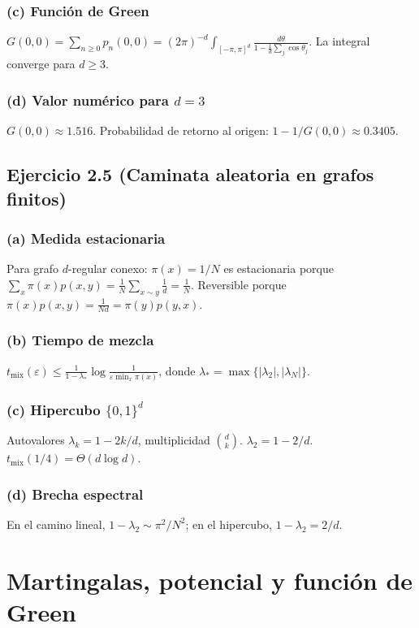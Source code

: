 \documentclass[12pt]{article}
\newcommand{\1}{\mathbf{1}}
\begin{document}
\subsubsection*{(c) Funci\'on de Green}
$G(0,0)=\sum_{n\ge0}p_n(0,0)=(2\pi)^{-d}\int_{[-\pi,\pi]^d}\frac{d\theta}{1-\frac1d\sum_j\cos\theta_j}$. La integral converge para $d\ge3$.

\subsubsection*{(d) Valor num\'erico para $d=3$}
$G(0,0)\approx1.516$. Probabilidad de retorno al origen: $1-1/G(0,0)\approx0.3405$.

\subsection{Ejercicio 2.5 (Caminata aleatoria en grafos finitos)}

\subsubsection*{(a) Medida estacionaria}
Para grafo $d$-regular conexo: $\pi(x)=1/N$ es estacionaria porque $\sum_x \pi(x)p(x,y)=\frac1N\sum_{x\sim y}\frac1d=\frac1N$. Reversible porque $\pi(x)p(x,y)=\frac1{Nd}=\pi(y)p(y,x)$.

\subsubsection*{(b) Tiempo de mezcla}
$t_{\text{mix}}(\varepsilon)\le\frac{1}{1-\lambda_*}\log\frac{1}{\varepsilon\min_x\pi(x)}$, donde $\lambda_*=\max\{|\lambda_2|,|\lambda_N|\}$.

\subsubsection*{(c) Hipercubo $\{0,1\}^d$}
Autovalores $\lambda_k=1-2k/d$, multiplicidad $\binom{d}{k}$. $\lambda_2=1-2/d$. $t_{\text{mix}}(1/4)=\Theta(d\log d)$.

\subsubsection*{(d) Brecha espectral}
En el camino lineal, $1-\lambda_2\sim\pi^2/N^2$; en el hipercubo, $1-\lambda_2=2/d$.

\section{Martingalas, potencial y funci\'on de Green}
\end{document}
